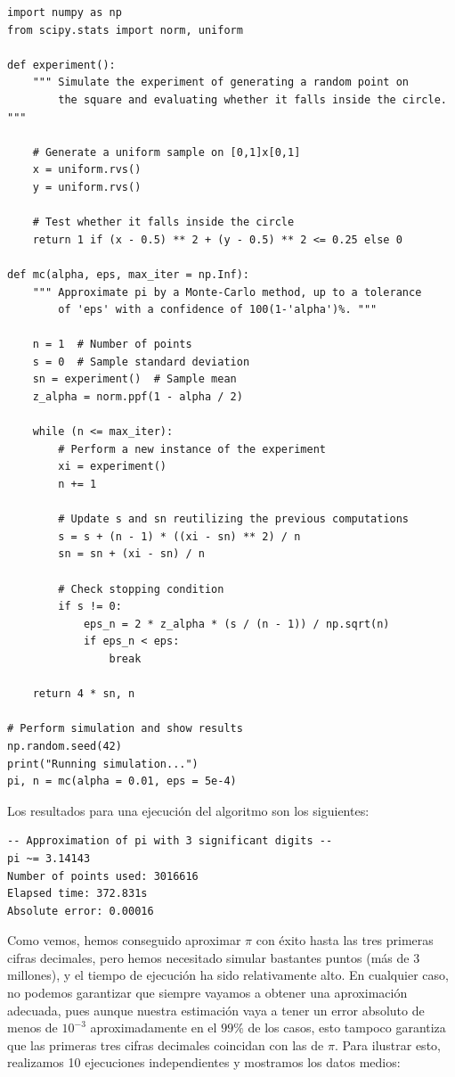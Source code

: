 \documentclass[11pt,a4paper]{article}
\begin{document}
\begin{verbatim}
import numpy as np
from scipy.stats import norm, uniform

def experiment():
    """ Simulate the experiment of generating a random point on
        the square and evaluating whether it falls inside the circle. """

    # Generate a uniform sample on [0,1]x[0,1]
    x = uniform.rvs()
    y = uniform.rvs()

    # Test whether it falls inside the circle
    return 1 if (x - 0.5) ** 2 + (y - 0.5) ** 2 <= 0.25 else 0

def mc(alpha, eps, max_iter = np.Inf):
    """ Approximate pi by a Monte-Carlo method, up to a tolerance
        of 'eps' with a confidence of 100(1-'alpha')%. """

    n = 1  # Number of points
    s = 0  # Sample standard deviation
    sn = experiment()  # Sample mean
    z_alpha = norm.ppf(1 - alpha / 2)

    while (n <= max_iter):
        # Perform a new instance of the experiment
        xi = experiment()
        n += 1

        # Update s and sn reutilizing the previous computations
        s = s + (n - 1) * ((xi - sn) ** 2) / n
        sn = sn + (xi - sn) / n

        # Check stopping condition
        if s != 0:
            eps_n = 2 * z_alpha * (s / (n - 1)) / np.sqrt(n)
            if eps_n < eps:
                break

    return 4 * sn, n

# Perform simulation and show results
np.random.seed(42)
print("Running simulation...")
pi, n = mc(alpha = 0.01, eps = 5e-4)
\end{verbatim}

\newpage
Los resultados para una ejecución del algoritmo son los siguientes:

\begin{verbatim}
-- Approximation of pi with 3 significant digits --
pi ~= 3.14143
Number of points used: 3016616
Elapsed time: 372.831s
Absolute error: 0.00016
\end{verbatim}

Como vemos, hemos conseguido aproximar $\pi$ con éxito hasta las tres primeras cifras decimales, pero hemos necesitado simular bastantes puntos (más de 3 millones), y el tiempo de ejecución ha sido relativamente alto. En cualquier caso, no podemos garantizar que siempre vayamos a obtener una aproximación adecuada, pues aunque nuestra estimación vaya a tener un error absoluto de menos de $10^{-3}$ aproximadamente en el $99\%$ de los casos, esto tampoco garantiza que las primeras tres cifras decimales coincidan con las de $\pi$. Para ilustrar esto, realizamos 10 ejecuciones independientes y mostramos los datos medios:
\end{document}
